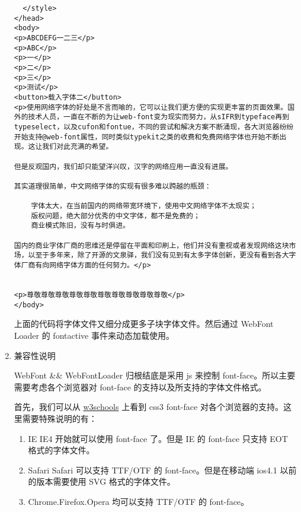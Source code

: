 \documentclass[a4paper,12pt]{report}
\begin{document}
\begin{enumerate}
\begin{verbatim}
  </style>
</head>
<body>
<p>ABCDEFG一二三</p>
<p>ABC</p>
<p>一</p>
<p>二</p>
<p>三</p>
<p>测试</p>
<button>载入字体二</button>
<p>使用网络字体的好处是不言而喻的，它可以让我们更方便的实现更丰富的页面效果。国外的技术人员，一直在不断的为让web-font变为现实而努力，从sIFR到typeface再到typeselect，以及cufon和fontue，不同的尝试和解决方案不断涌现，各大浏览器纷纷开始支持@web-font属性，同时类似typekit之类的收费和免费网络字体也开始不断出现。这让我们对此充满的希望。

但是反观国内，我们却只能望洋兴叹，汉字的网络应用一直没有进展。

其实道理很简单，中文网络字体的实现有很多难以跨越的瓶颈：

    字体太大，在当前国内的网络带宽环境下，使用中文网络字体不太现实；
    版权问题，绝大部分优秀的中文字体，都不是免费的；
    商业模式陈旧，没有与时俱进。

国内的商业字体厂商的思维还是停留在平面和印刷上，他们并没有重视或者发现网络这块市场，以至于多年来，除了开源的文泉驿，我们没有见到有太多字体创新，更没有看到各大字体厂商有向网络字体方面的任何努力。</p>


<p>尊敬尊敬尊敬尊敬尊敬尊敬尊敬尊敬尊敬尊敬</p>
</body>

\end{verbatim}

上面的代码将字体文件又细分成更多子块字体文件。然后通过 WebFont Loader 的 fontactive 事件来动态加载使用。

\item 兼容性说明

WebFont \&\& WebFontLoader 归根结底是采用 js 来控制 font-face。所以主要需要考虑各个浏览器对 font-face 的支持以及所支持的字体文件格式。

首先，我们可以从 \href{http://www.w3schools.com/cssref/css3_browsersupport.asp}{w3schools} 上看到 css3 font-face 对各个浏览器的支持。这里需要特殊说明的有：

  \begin{enumerate}

  \item IE
  IE4 开始就可以使用 font-face 了。但是 IE 的 font-face 只支持 EOT 格式的字体文件。

  \item Safari
  Safari 可以支持 TTF/OTF 的 font-face。但是在移动端 ios4.1 以前的版本需要使用 SVG 格式的字体文件。

  \item Chrome.Firefox.Opera
  均可以支持 TTF/OTF 的 font-face。

  \end{enumerate}

\end{enumerate}
\end{document}
